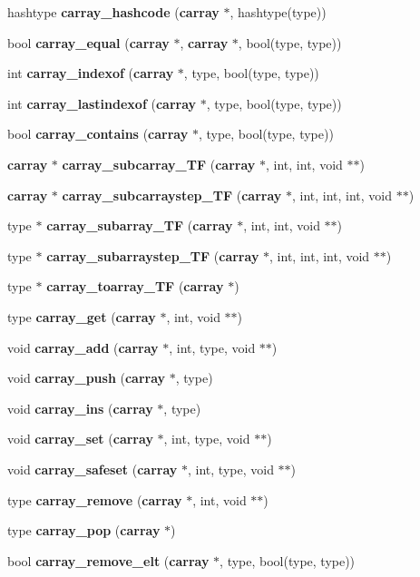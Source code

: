\begin{DoxyCompactItemize}
\item 
hashtype {\bfseries carray\+\_\+hashcode} ({\bf carray} $\ast$, hashtype(type))\label{group__method__group_gab6fce3c1883194f7b4e298d108249b00}

\item 
bool {\bfseries carray\+\_\+equal} ({\bf carray} $\ast$, {\bf carray} $\ast$, bool(type, type))\label{group__method__group_gaccb5ee3de6441dcf90e5ae9c214d6858}

\item 
int {\bfseries carray\+\_\+indexof} ({\bf carray} $\ast$, type, bool(type, type))\label{group__method__group_ga097246bae1483f9b0aec8fed166a2ba5}

\item 
int {\bfseries carray\+\_\+lastindexof} ({\bf carray} $\ast$, type, bool(type, type))\label{group__method__group_ga322e73429a9d78339367f844d5aa74cd}

\item 
bool {\bfseries carray\+\_\+contains} ({\bf carray} $\ast$, type, bool(type, type))\label{group__method__group_gac98417b7832e24a9aa15ef44681b728e}

\item 
{\bf carray} $\ast$ {\bf carray\+\_\+subcarray\+\_\+\+TF} ({\bf carray} $\ast$, int, int, void $\ast$$\ast$)
\item 
{\bf carray} $\ast$ {\bf carray\+\_\+subcarraystep\+\_\+\+TF} ({\bf carray} $\ast$, int, int, int, void $\ast$$\ast$)
\item 
type $\ast$ {\bf carray\+\_\+subarray\+\_\+\+TF} ({\bf carray} $\ast$, int, int, void $\ast$$\ast$)
\item 
type $\ast$ {\bf carray\+\_\+subarraystep\+\_\+\+TF} ({\bf carray} $\ast$, int, int, int, void $\ast$$\ast$)
\item 
type $\ast$ {\bf carray\+\_\+toarray\+\_\+\+TF} ({\bf carray} $\ast$)
\item 
type {\bf carray\+\_\+get} ({\bf carray} $\ast$, int, void $\ast$$\ast$)
\item 
void {\bf carray\+\_\+add} ({\bf carray} $\ast$, int, type, void $\ast$$\ast$)
\item 
void {\bf carray\+\_\+push} ({\bf carray} $\ast$, type)
\item 
void {\bf carray\+\_\+ins} ({\bf carray} $\ast$, type)
\item 
void {\bf carray\+\_\+set} ({\bf carray} $\ast$, int, type, void $\ast$$\ast$)
\item 
void {\bf carray\+\_\+safeset} ({\bf carray} $\ast$, int, type, void $\ast$$\ast$)
\item 
type {\bf carray\+\_\+remove} ({\bf carray} $\ast$, int, void $\ast$$\ast$)
\item 
type {\bf carray\+\_\+pop} ({\bf carray} $\ast$)
\item 
bool {\bfseries carray\+\_\+remove\+\_\+elt} ({\bf carray} $\ast$, type, bool(type, type))\label{group__method__group_gaf0547e1fd95952667b22f433485ad7fd}

\end{DoxyCompactItemize}


